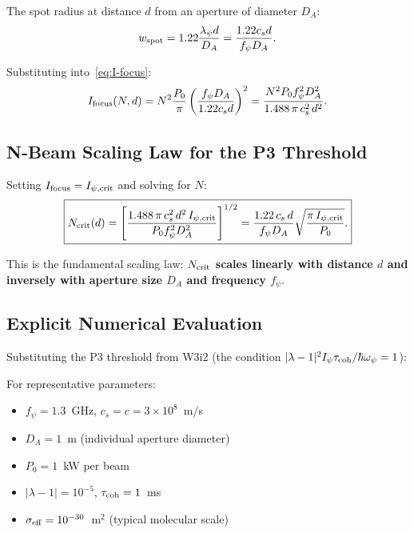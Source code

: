 \documentclass[aps,prd,twocolumn,superscriptaddress]{revtex4-2}
\begin{document}
The spot radius at distance $d$ from an aperture of diameter $D_A$:
\begin{equation}
w_{\rm spot} = 1.22 \frac{\lambda_\psi d}{D_A}
= \frac{1.22 c_s d}{f_\psi D_A}.
\label{eq:spot-radius}
\end{equation}

Substituting into~\eqref{eq:I-focus}:
\begin{equation}
I_{\rm focus}(N,d) = N^2 \frac{P_0}{\pi}\left(\frac{f_\psi D_A}{1.22 c_s d}\right)^2
= \frac{N^2 P_0 f_\psi^2 D_A^2}{1.488\,\pi\, c_s^2\, d^2}.
\label{eq:I-focus-full}
\end{equation}

\subsection{N-Beam Scaling Law for the P3 Threshold}

Setting $I_{\rm focus} = I_{\psi,\rm crit}$ and solving for $N$:
\begin{equation}
\boxed{
N_{\rm crit}(d) = \left[\frac{1.488\,\pi\, c_s^2\, d^2\,I_{\psi,\rm crit}}
{P_0 f_\psi^2 D_A^2}\right]^{1/2}
= \frac{1.22\,c_s\, d}{f_\psi D_A}
\sqrt{\frac{\pi\, I_{\psi,\rm crit}}{P_0}}.
}
\label{eq:N-crit}
\end{equation}

This is the fundamental scaling law: \textbf{$N_{\rm crit}$ scales linearly
with distance $d$ and inversely with aperture size $D_A$ and frequency
$f_\psi$}.

\subsection{Explicit Numerical Evaluation}

Substituting the P3 threshold from W3i2 (the condition
$|\lambda-1|^2 I_\psi \tau_{\rm coh} / \hbar\omega_\psi = 1$):

For representative parameters:
\begin{itemize}
  \item $f_\psi = 1.3$~GHz, $c_s = c = 3\times10^8$~m/s
  \item $D_A = 1$~m (individual aperture diameter)
  \item $P_0 = 1$~kW per beam
  \item $|\lambda-1| = 10^{-5}$, $\tau_{\rm coh} = 1$~ms
  \item $\sigma_{\rm eff} = 10^{-30}$~m$^2$ (typical molecular scale)
\end{itemize}
\end{document}
